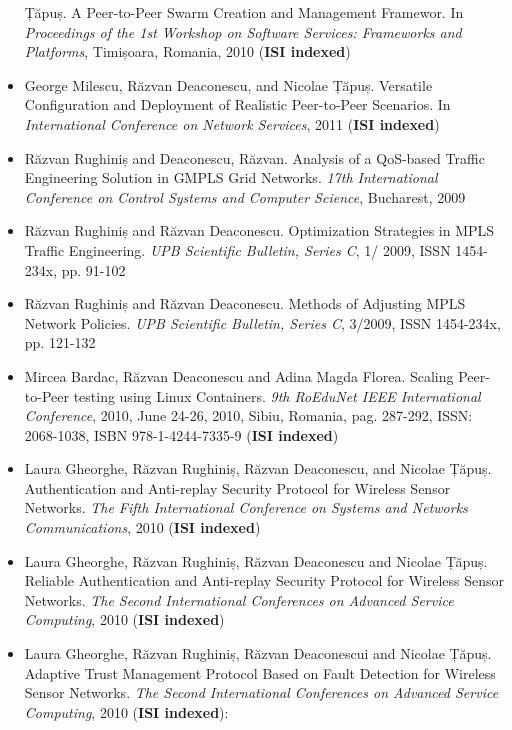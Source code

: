\begin{itemize}
  Țăpuș. A Peer-to-Peer Swarm Creation and Management Framewor. In
  \textit{Proceedings of the 1st Workshop on Software Services: Frameworks and
  Platforms}, Timișoara, Romania, 2010 (\textbf{ISI indexed})
  \item George Milescu, Răzvan Deaconescu, and Nicolae Țăpuș. Versatile
  Configuration and Deployment of Realistic Peer-to-Peer Scenarios. In
  \textit{International Conference on Network Services}, 2011 (\textbf{ISI
  indexed})
  \item Răzvan Rughiniș and Deaconescu, Răzvan. Analysis of a QoS-based
  Traffic Engineering Solution in GMPLS Grid Networks. \textit{17th
  International Conference on Control Systems and Computer Science},
  Bucharest, 2009
  \item Răzvan Rughiniș and Răzvan Deaconescu. Optimization Strategies in MPLS
  Traffic Engineering. \textit{UPB Scientific Bulletin, Series C}, 1/ 2009,
  ISSN 1454-234x, pp. 91-102
  \item Răzvan Rughiniș and Răzvan Deaconescu. Methods of Adjusting MPLS
  Network Policies. \textit{UPB Scientific Bulletin, Series C}, 3/2009, ISSN
  1454-234x, pp. 121-132
  \item Mircea Bardac, Răzvan Deaconescu and Adina Magda Florea. Scaling
  Peer-to-Peer testing using Linux Containers. \textit{9th RoEduNet IEEE
  International Conference}, 2010, June 24-26, 2010, Sibiu, Romania, pag.
  287-292, ISSN: 2068-1038, ISBN 978-1-4244-7335-9 (\textbf{ISI indexed})
  \item Laura Gheorghe, Răzvan Rughiniș, Răzvan Deaconescu, and Nicolae Țăpuș.
  Authentication and Anti-replay Security Protocol for Wireless Sensor
  Networks. \textit{The Fifth International Conference on Systems and Networks
  Communications}, 2010 (\textbf{ISI indexed})
  \item Laura Gheorghe, Răzvan Rughiniș, Răzvan Deaconescu and Nicolae Țăpuș.
  Reliable Authentication and Anti-replay Security Protocol for Wireless
  Sensor Networks. \textit{The Second International Conferences on Advanced
  Service Computing}, 2010 (\textbf{ISI indexed})
  \item Laura Gheorghe, Răzvan Rughiniș, Răzvan Deaconescui and Nicolae Țăpuș.
  Adaptive Trust Management Protocol Based on Fault Detection for Wireless
  Sensor Networks. \textit{The Second International Conferences on Advanced
  Service Computing}, 2010 (\textbf{ISI indexed}):
\end{itemize}
